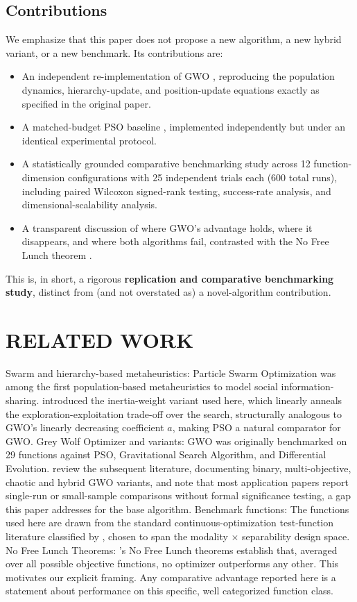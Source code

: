 \documentclass[journal]{IEEEtran}
\begin{document}
\subsection {Contributions}

We emphasize that this paper does not propose a new algorithm, a new hybrid variant, or a new benchmark. Its contributions are:
\begin{itemize}
  \item An independent re-implementation of GWO \cite{mirjalili2014}, reproducing the population dynamics, hierarchy-update, and position-update equations exactly as specified in the original paper.
  \item A matched-budget PSO baseline \cite{kennedy1995,shi1998}, implemented independently but under an identical experimental protocol.
  \item A statistically grounded comparative benchmarking study across 12 function-dimension configurations with 25 independent trials each (600 total runs), including paired Wilcoxon signed-rank testing, success-rate analysis, and dimensional-scalability analysis.
  \item A transparent discussion of where GWO's advantage holds, where it disappears, and where both algorithms fail, contrasted  with the No Free Lunch theorem \cite{wolpert1997}.
\end{itemize}

This is, in short, a rigorous \textbf{replication and comparative benchmarking study}, distinct from (and not overstated as) a novel-algorithm contribution.


\section {RELATED WORK}

Swarm and hierarchy-based metaheuristics: Particle Swarm Optimization \cite{kennedy1995} was among the first population-based metaheuristics to model social information-sharing. \cite{shi1998} introduced the inertia-weight variant used here, which linearly anneals the exploration-exploitation trade-off over the search, structurally analogous to GWO's linearly decreasing coefficient $a$, making PSO a natural comparator for GWO. Grey Wolf Optimizer and variants: GWO \cite{mirjalili2014} was originally benchmarked on 29 functions against PSO, Gravitational Search Algorithm, and Differential Evolution. \cite{faris2018} review the subsequent literature, documenting binary, multi-objective, chaotic and hybrid GWO variants, and note that most application papers report single-run or small-sample comparisons without formal significance testing, a gap this paper addresses for the base algorithm. Benchmark functions: The functions used here are drawn from the standard continuous-optimization test-function literature classified by \cite{jamil2013}, chosen to span the modality $\times$ separability design space. No Free Lunch Theorems: \cite{wolpert1997}'s No Free Lunch theorems establish that, averaged over all possible objective functions, no optimizer outperforms any other. This motivates our explicit framing. Any comparative advantage reported here is a statement about performance on this specific, well categorized function class.
\end{document}
